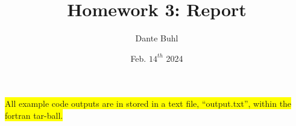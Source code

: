\documentclass{article}
\title{Homework 3: Report}
\author{Dante Buhl}
\date{Feb. $14^{th}$ 2024}
\begin{document}
\newcommand{\bs}[1]{\boldsymbol{#1}}
\newcommand{\bmp}[1]{\begin{minipage}{#1\textwidth}}
\newcommand{\emp}{\end{minipage}}
\newcommand{\R}{\mathbb{R}}
\newcommand{\C}{\mathbb{C}}
\newcommand{\N}{\mathcal{N}}
\newcommand{\I}{\mathrm{I}}
\newcommand{\K}{\bs{\mathrm{K}}}
\newcommand{\m}{\bs{\mu}_*}
\newcommand{\s}{\bs{\Sigma}_*}
\newcommand{\dt}{\Delta t}
\newcommand{\tr}[1]{\text{Tr}(#1)}
\newcommand{\Tr}[1]{\text{Tr}(#1)}

\maketitle

\colorbox{yellow}{All example code outputs are in stored in a text file, ``output.txt'', within the fortran tar-ball.}
\end{document}
